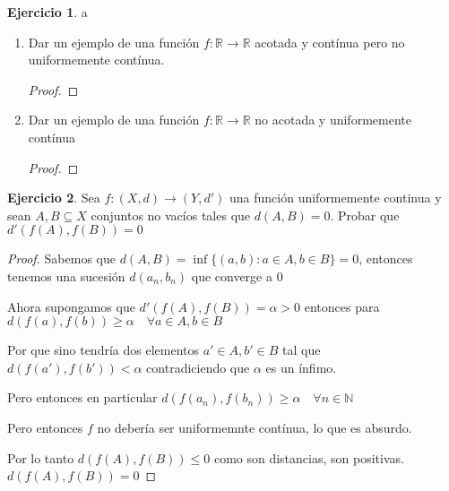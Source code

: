 \documentclass[11pt]{report}
\newcommand{\R}{\mathbb{R}}
\newcommand{\N}{\mathbb{N}}
\newcommand{\ra}{\rightarrow}
\theoremstyle{definition}
\newtheorem{ej}{Ejercicio}
\begin{document}
	\begin{ej}a
		\begin{enumerate}
			\item Dar un ejemplo de una función $f: \R \ra \R$ acotada y contínua pero no uniformemente contínua.
				\begin{proof}
					

				\end{proof}
				
			\item Dar un ejemplo de una función $f : \R \ra \R$ no acotada y uniformemente contínua
				\begin{proof}
					
				\end{proof}
				
				
		\end{enumerate}
	\end{ej}
	
		

	\begin{ej}
		Sea $f:(X,d) \ra (Y,d')$ una función uniformemente continua y sean $A,B \subseteq X$ conjuntos no vacíos tales que $d(A,B) = 0$. Probar que $d'(f(A),f(B)) = 0$
		\begin{proof}
		  Sabemos que $d(A,B) = \inf\{(a,b):a \in A, b \in B\} = 0$, entonces tenemos una sucesión $d(a_n,b_n)$ que converge a 0

		  Ahora supongamos que $d'(f(A),f(B)) = \alpha > 0 $ entonces para $d(f(a),f(b)) \geq \alpha \quad \forall a \in A ,b \in B$

		  Por que sino tendría dos elementos $a'\in A, b'\in B$ tal que $d(f(a'),f(b')) < \alpha$ contradiciendo que $\alpha$ es un ínfimo.

		  Pero entonces en particular $d(f(a_n),f(b_n)) \geq \alpha \quad \forall n \in \N$

		  Pero entonces $f$ no debería ser uniformemnte contínua, lo que es absurdo.

		  Por lo tanto $d(f(A),f(B)) \leq 0$ como son distancias, son positivas. $d(f(A),f(B)) = 0$
		\end{proof}
		
		
	\end{ej}
	
\end{document}
